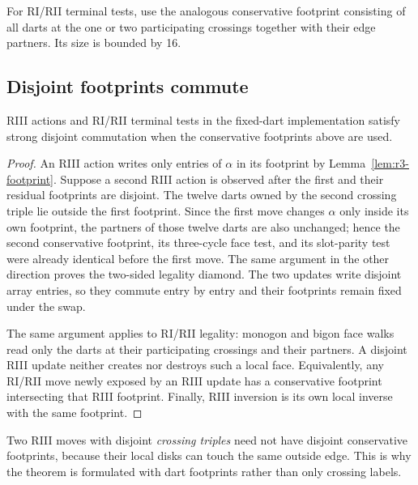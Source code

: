 For RI/RII terminal tests, use the analogous conservative footprint consisting
of all darts at the one or two participating crossings together with their edge
partners.  Its size is bounded by 16.

\subsection{Disjoint footprints commute}

\begin{proposition}
\label{prop:r3-locality}
RIII actions and RI/RII terminal tests in the fixed-dart implementation satisfy
strong disjoint commutation when the conservative footprints above are used.
\end{proposition}

\begin{proof}
An RIII action writes only entries of $\alpha$ in its footprint by
Lemma~\ref{lem:r3-footprint}.  Suppose a second RIII action is observed after
the first and their residual footprints are disjoint.  The twelve darts owned
by the second crossing triple lie outside the first footprint.  Since the first
move changes $\alpha$ only inside its own footprint, the partners of those
twelve darts are also unchanged; hence the second conservative footprint, its
three-cycle face test, and its slot-parity test were already identical before
the first move.  The same argument in the other direction proves the two-sided
legality diamond.  The two updates write disjoint array entries, so they commute
entry by entry and their footprints remain fixed under the swap.

The same argument applies to RI/RII legality: monogon and bigon face walks read
only the darts at their participating crossings and their partners.  A
disjoint RIII update neither creates nor destroys such a local face.  Equivalently,
any RI/RII move newly exposed by an RIII update has a conservative footprint
intersecting that RIII footprint.  Finally, RIII inversion is its own local
inverse with the same footprint.
\end{proof}

\begin{remark}
Two RIII moves with disjoint \emph{crossing triples} need not have disjoint
conservative footprints, because their local disks can touch the same outside
edge.  This is why the theorem is formulated with dart footprints rather than
only crossing labels.
\end{remark}

